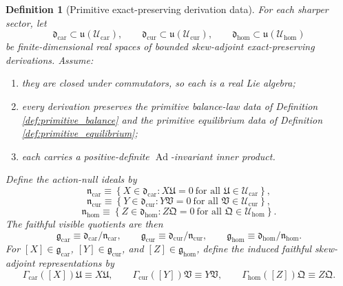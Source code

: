 \documentclass[11pt]{article}
\newcommand{\RootTensorClass}{\mathscr U_{\mathrm{car}}}
\newcommand{\RootRelabelClass}{\mathscr U_{\mathrm{cur}}}
\newcommand{\RootFreeClass}{\mathscr U_{\mathrm{hom}}}
\newcommand{\RootTensor}{\mathfrak U}
\newcommand{\RootRelabel}{\mathfrak V}
\newcommand{\RootFree}{\mathfrak Q}
\newcommand{\TensorChargeAlg}{\mathfrak g_{\mathrm{car}}}
\newcommand{\CurChargeAlg}{\mathfrak g_{\mathrm{cur}}}
\newcommand{\HomChargeAlg}{\mathfrak g_{\mathrm{hom}}}
\newcommand{\TensorGen}{\Gamma_{\mathrm{car}}}
\newcommand{\CurGen}{\Gamma_{\mathrm{cur}}}
\newcommand{\HomGen}{\Gamma_{\mathrm{hom}}}
\newcommand{\TensorDerAlg}{\mathfrak d_{\mathrm{car}}}
\newcommand{\CurDerAlg}{\mathfrak d_{\mathrm{cur}}}
\newcommand{\HomDerAlg}{\mathfrak d_{\mathrm{hom}}}
\newcommand{\TensorActNull}{\mathfrak n_{\mathrm{car}}}
\newcommand{\CurActNull}{\mathfrak n_{\mathrm{cur}}}
\newcommand{\HomActNull}{\mathfrak n_{\mathrm{hom}}}
\newtheorem{definition}{Definition}
\begin{document}
\begin{definition}[Primitive exact-preserving derivation data]
\label{def:primitive_derivations}
For each sharper sector, let
\[
\TensorDerAlg\subset\mathfrak u(\RootTensorClass),\qquad
\CurDerAlg\subset\mathfrak u(\RootRelabelClass),\qquad
\HomDerAlg\subset\mathfrak u(\RootFreeClass)
\]
be finite-dimensional real spaces of bounded skew-adjoint exact-preserving derivations. Assume:
\begin{enumerate}
    \item they are closed under commutators, so each is a real Lie algebra;
    \item every derivation preserves the primitive balance-law data of Definition \ref{def:primitive_balance} and the primitive equilibrium data of Definition \ref{def:primitive_equilibrium};
    \item each carries a positive-definite \(\operatorname{Ad}\)-invariant inner product.
\end{enumerate}
Define the action-null ideals by
\begin{equation}
\TensorActNull
\equiv
\left\{
X\in\TensorDerAlg: X\RootTensor=0 \ \text{for all }\RootTensor\in\RootTensorClass
\right\},
\label{eq:null_car}
\end{equation}
\begin{equation}
\CurActNull
\equiv
\left\{
Y\in\CurDerAlg: Y\RootRelabel=0 \ \text{for all }\RootRelabel\in\RootRelabelClass
\right\},
\label{eq:null_cur}
\end{equation}
\begin{equation}
\HomActNull
\equiv
\left\{
Z\in\HomDerAlg: Z\RootFree=0 \ \text{for all }\RootFree\in\RootFreeClass
\right\}.
\label{eq:null_hom}
\end{equation}
The faithful visible quotients are then
\begin{equation}
\TensorChargeAlg\equiv\TensorDerAlg/\TensorActNull,\qquad
\CurChargeAlg\equiv\CurDerAlg/\CurActNull,\qquad
\HomChargeAlg\equiv\HomDerAlg/\HomActNull.
\label{eq:charge_as_quotient}
\end{equation}
For \([X]\in\TensorChargeAlg\), \([Y]\in\CurChargeAlg\), and \([Z]\in\HomChargeAlg\), define the induced faithful skew-adjoint representations by
\begin{equation}
\TensorGen([X])\RootTensor\equiv X\RootTensor,\qquad
\CurGen([Y])\RootRelabel\equiv Y\RootRelabel,\qquad
\HomGen([Z])\RootFree\equiv Z\RootFree.
\label{eq:quotient_generators}
\end{equation}
\end{definition}
\end{document}
